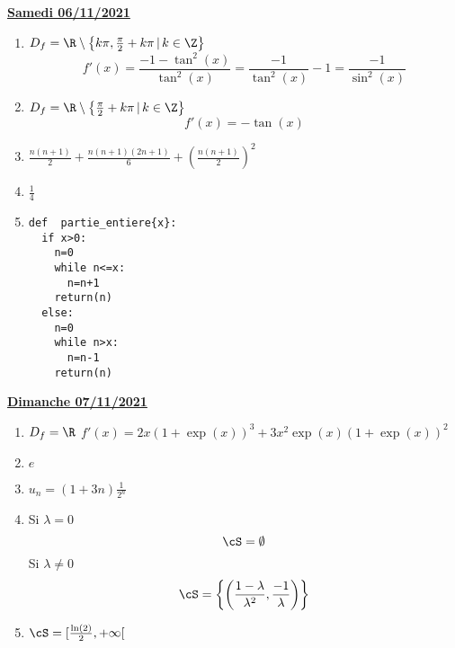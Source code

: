 \documentclass[a4paper, 11pt,reqno]{article}
\newcommand{\jour}[1]{
\begin{center}
\underline{\textbf{#1}}
\end{center}

 }
\begin{document}
\jour{Samedi  06/11/2021}
\begin{correction}
\begin{enumerate}
\item $D_f  = \R \setminus\left\{  k\pi , \frac{\pi}{2}+k\pi\, |\, k\in\Z \right\}$
$$f'(x) =\frac{-1-\tan^2(x)}{\tan^2(x)}=\frac{-1}{\tan^2(x)}-1=\frac{-1}{\sin^2(x)}$$
\item $D_f =  \R \setminus\left\{ \frac{\pi}{2}+k\pi\, |\, k\in\Z \right\}$
$$f'(x) = -\tan(x)$$
\item $\frac{n(n+1)}{2}+\frac{n(n+1)(2n+1)}{6}+\left(\frac{n(n+1)}{2}\right)^2$
\item $\frac{1}{4}$
\item 
\begin{lstlisting}
def  partie_entiere{x}:
  if x>0:
    n=0
    while n<=x:
      n=n+1
    return(n)
  else:
    n=0
    while n>x:
      n=n-1
    return(n)

\end{lstlisting}
\end{enumerate}
\end{correction} 


\jour{Dimanche  07/11/2021}
\begin{correction}
\begin{enumerate}
\item $D_f=\R$ $f'(x) = 2x(1+\exp(x))^3 + 3x^2\exp(x)(1+\exp(x))^2$ 
\item $e$
\item $u_n = (1+3n)\frac{1}{2^n}$
\item Si $\lambda =0$\\
$$\cS=\emptyset$$
 Si $\lambda \neq 0$\\
$$\cS=\left\{   \left( \frac{1-\lambda}{\lambda^2} , \frac{-1}{\lambda} \right) \right\} $$

\item $\cS = [\frac{\ln(2)}{2},+\infty[$
\end{enumerate}
\end{correction} 
\end{document}

